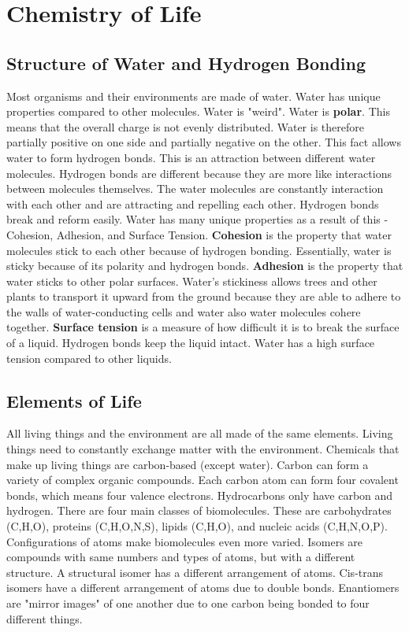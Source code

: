 \documentclass[../bio.tex]{subfiles}
\begin{document}
\chapter{Chemistry of Life}
\section{Structure of Water and Hydrogen Bonding}
Most organisms and their environments are made of water. Water has unique properties compared to other molecules. Water is "weird".
\smallbreak
Water is \textbf{polar}. This means that the overall charge is not evenly distributed. Water is therefore partially positive on one side and partially negative on the other.
\smallbreak
This fact allows water to form hydrogen bonds. This is an attraction between different water molecules. 
Hydrogen bonds are different because they are more like interactions between molecules themselves. 
The water molecules are constantly interaction with each other and are attracting and repelling each other. 
Hydrogen bonds break and reform easily.
\smallbreak
Water has many unique properties as a result of this -  Cohesion, Adhesion, and Surface Tension.
\smallbreak
\textbf{Cohesion} is the property that water molecules stick to each other because of hydrogen bonding.
Essentially, water is sticky because of its polarity and hydrogen bonds.
\smallbreak
\textbf{Adhesion} is the property that water sticks to other polar surfaces. 
\smallbreak
Water's stickiness allows trees and other plants to transport it upward from the ground because they are able to adhere to the walls of water-conducting cells and water also water molecules cohere together.
\smallbreak 
\textbf{Surface tension} is a measure of how difficult it is to break the surface of a liquid. Hydrogen bonds keep the liquid intact. Water has a high surface tension compared to other liquids.
\smallbreak
\section{Elements of Life}
All living things and the environment are all made of the same elements. Living things need to constantly exchange matter with the environment. 
\smallbreak
Chemicals that make up living things are carbon-based (except water). Carbon can form a variety of complex organic compounds. Each carbon atom can form four covalent bonds, which means four valence electrons. Hydrocarbons only have carbon and hydrogen. 
\smallbreak
There are four main classes of biomolecules. These are carbohydrates (C,H,O), proteins (C,H,O,N,S), lipids (C,H,O), and nucleic acids (C,H,N,O,P). Configurations of atoms make biomolecules even more varied. Isomers are compounds with same numbers and types of atoms, but with a different structure. 
\smallbreak
A structural isomer has a different arrangement of atoms. Cis-trans isomers have a different arrangement of atoms due to double bonds. Enantiomers are "mirror images" of one another due to one carbon being bonded to four different things.   
\end{document}
